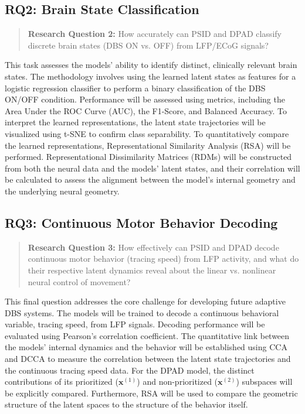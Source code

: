 \documentclass[12pt, a4paper]{article}
\begin{document}
\subsection{RQ2: Brain State Classification}
\begin{quote}
    \textbf{Research Question 2:} How accurately can PSID and DPAD classify discrete brain states (DBS ON vs. OFF) from LFP/ECoG signals?
\end{quote}

This task assesses the models' ability to identify distinct, clinically relevant brain states. The methodology involves using the learned latent states as features for a logistic regression classifier to perform a binary classification of the DBS ON/OFF condition. Performance will be assessed using metrics, including the Area Under the ROC Curve (AUC), the F1-Score, and Balanced Accuracy. To interpret the learned representations, the latent state trajectories will be visualized using t-SNE to confirm class separability. To quantitatively compare the learned representations, Representational Similarity Analysis (RSA) will be performed. Representational Dissimilarity Matrices (RDMs) will be constructed from both the neural data and the models' latent states, and their correlation will be calculated to assess the alignment between the model's internal geometry and the underlying neural geometry. 
\subsection{RQ3: Continuous Motor Behavior Decoding}
\begin{quote}
    \textbf{Research Question 3:} How effectively can PSID and DPAD decode continuous motor behavior (tracing speed) from LFP activity, and what do their respective latent dynamics reveal about the linear vs. nonlinear neural control of movement?
\end{quote}

This final question addresses the core challenge for developing future adaptive DBS systems. The models will be trained to decode a continuous behavioral variable, tracing speed, from LFP signals. Decoding performance will be evaluated using Pearson's correlation coefficient. The quantitative link between the models' internal dynamics and the behavior will be established using CCA and DCCA to measure the correlation between the latent state trajectories and the continuous tracing speed data. For the DPAD model, the distinct contributions of its prioritized ($\mathbf{x}^{(1)}$) and non-prioritized ($\mathbf{x}^{(2)}$) subspaces will be explicitly compared. Furthermore, RSA will be used to compare the geometric structure of the latent spaces to the structure of the behavior itself.
\end{document}
